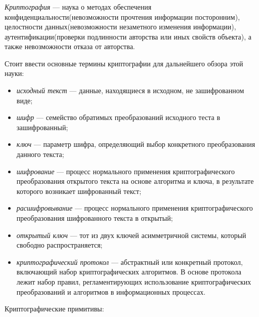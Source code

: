 \subsubsection{}
\label{sec:analysis:research:crypto:general}

\emph{Криптография} --- наука о методах обеспечения конфиденциальности(невозможности прочтения информации посторонним), целостности данных(невозможности незаметного изменения информации), аутентификации(проверки подлинности авторства или иных свойств объекта), а также невозможности отказа от авторства. \cite{wiki:crypto}

Стоит ввести основные термины криптографии для дальнейшего обзора этой науки:

\begin{itemize}
	\item \emph{исходный текст} --- данные, находящиеся в исходном, не зашифрованном виде;
	\item \emph{шифр} --- семейство обратимых преобразований исходного теста в зашифрованный;
	\item \emph{ключ} --- параметр шифра, определяющий выбор конкретного преобразования данного текста;
	\item \emph{шифрование} --- процесс нормального применения криптографического преобразования открытого текста на основе алгоритма и ключа, в результате которого возникает шифрованный текст;
	\item \emph{расшифровывание} --- процесс нормального применения криптографического преобразования шифрованного текста в открытый;
	\item \emph{открытый ключ} --- тот из двух ключей асимметричной системы, который свободно распространяется;
	\item \emph{криптографический протокол} --- абстрактный или конкретный протокол, включающий набор криптографических алгоритмов. В основе протокола лежит набор правил, регламентирующих использование криптографических преобразований и алгоритмов в информационных процессах.
\end{itemize}

Криптографические примитивы:

